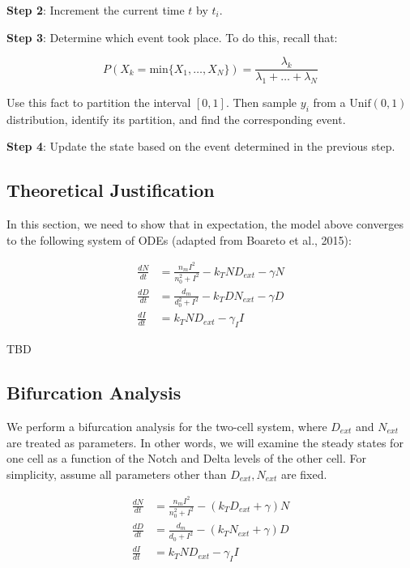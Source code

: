 \documentclass{article}
\begin{document}
\begin{flushleft}
\medskip

\textbf{Step 2}: Increment the current time $t$ by $t_{i}$.

\medskip

\textbf{Step 3}: Determine which event took place. To do this, recall that:

$$P(X_{k} = \text{min} \{  X_{1}, \dots, X_{N} \}) = \frac{\lambda_{k}}{\lambda_{1} + \dots + \lambda_{N}}$$

Use this fact to partition the interval $[0, 1]$. Then sample $y_{i}$ from a $\text{Unif}(0, 1)$ distribution, identify its partition, and find the corresponding event.

\medskip

\textbf{Step 4}: Update the state based on the event determined in the previous step.

\subsection{Theoretical Justification}

In this section, we need to show that in expectation, the model above converges to the following system of ODEs (adapted from Boareto et al., 2015):

$$
\begin{aligned}
  \frac{dN}{dt} &= \frac{n_{m}I^2}{n_{0}^2 + I^2} - k_{T}ND_{ext} - \gamma N \\[5pt]
  \frac{dD}{dt} &= \frac{d_{m}}{d_{0}^2 + I^2} - k_{T}DN_{ext} - \gamma D \\[5pt]
  \frac{dI}{dt} &= k_{T}ND_{ext} - \gamma_{I}I
\end{aligned}
$$

TBD

\subsection{Bifurcation Analysis}

We perform a bifurcation analysis for the two-cell system, where $D_{ext}$ and $N_{ext}$ are treated as parameters. In other words, we will examine the steady states for one cell as a function of the Notch and Delta levels of the other cell. For simplicity, assume all parameters other than $D_{ext}, N_{ext}$ are fixed.

$$
\begin{aligned}
  \frac{dN}{dt} &= \frac{n_{m}I^2}{n_{0}^2 + I^2} - (k_{T}D_{ext} + \gamma)N \\[5pt]
  \frac{dD}{dt} &= \frac{d_{m}}{d_{0} + I^2} - (k_{T}N_{ext} + \gamma)D \\[5pt]
  \frac{dI}{dt} &= k_{T}ND_{ext} - \gamma_{I}I \\[5pt]
\end{aligned}
$$


\end{flushleft}
\end{document}
